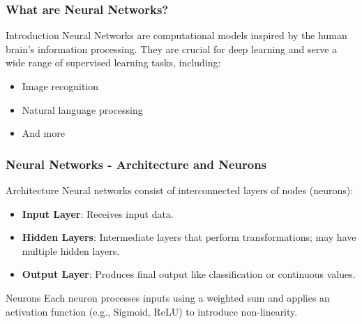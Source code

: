 \documentclass[aspectratio=169]{beamer}
\begin{document}
\begin{frame}[fragile]
    \frametitle{What are Neural Networks?}
    \begin{block}{Introduction}
        Neural Networks are computational models inspired by the human brain's information processing. They are crucial for deep learning and serve a wide range of supervised learning tasks, including:
        \begin{itemize}
            \item Image recognition
            \item Natural language processing
            \item And more
        \end{itemize}
    \end{block}
\end{frame}

\begin{frame}[fragile]
    \frametitle{Neural Networks - Architecture and Neurons}
    \begin{block}{Architecture}
        Neural networks consist of interconnected layers of nodes (neurons):
        \begin{itemize}
            \item \textbf{Input Layer}: Receives input data.
            \item \textbf{Hidden Layers}: Intermediate layers that perform transformations; may have multiple hidden layers.
            \item \textbf{Output Layer}: Produces final output like classification or continuous values.
        \end{itemize}
    \end{block}
    
    \begin{block}{Neurons}
        Each neuron processes inputs using a weighted sum and applies an activation function (e.g., Sigmoid, ReLU) to introduce non-linearity.
    \end{block}
\end{frame}
\end{document}
